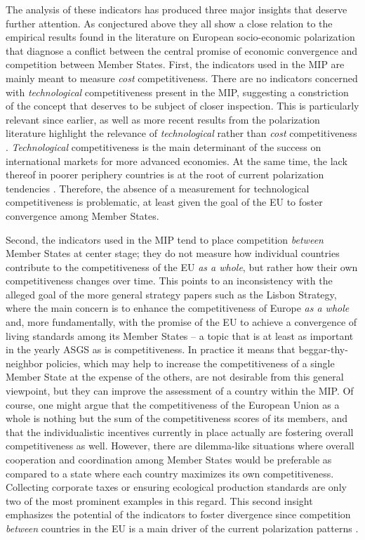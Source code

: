 \documentclass[
]{article}
\begin{document}
The analysis of these indicators has produced three major insights
that deserve further attention. As conjectured above they all show a close relation
to the empirical results found in the literature on European
socio-economic polarization
that diagnose a conflict between the central promise of economic convergence
and competition between Member States.
First, the indicators used in the MIP are mainly meant to
measure \emph{cost} competitiveness. There are no indicators concerned with \emph{technological}
competitiveness present in the MIP, suggesting a constriction of
the concept that deserves to be subject of closer inspection.
This is particularly relevant since earlier, as well as more recent results from
the polarization literature highlight the relevance of \emph{technological}
rather than \emph{cost} competitiveness
\citep[e.g.][]{Carlin.2001, Storm.2015jsi, Dosi.2015, Kapeller:2019cds}.
\emph{Technological} competitiveness is the main determinant of
the success on international markets for more advanced economies. At the same time,
the lack thereof in poorer periphery countries is at the root of current polarization
tendencies \citep[e.g.][]{Graebner.2020u}. Therefore, the absence of a measurement for
technological competitiveness is problematic, at least given the goal of the EU to
foster convergence among Member States.

Second, the indicators used in the MIP tend to place competition \emph{between}
Member States at center stage;
they do not measure how individual countries contribute to the competitiveness
of the EU \emph{as a whole}, but rather how their own competitiveness changes over
time. This points to an inconsistency with the alleged goal of the more
general strategy papers such as the Lisbon Strategy, where the main concern is to
enhance the competitiveness of Europe \emph{as a whole} and, more fundamentally, with
the promise of the EU to achieve a convergence of living standards among
its Member States -- a topic that is at least as important in the yearly ASGS
as is competitiveness.
In practice it means that beggar-thy-neighbor policies, which may help to increase the
competitiveness of a single Member State at the expense of the others, are not
desirable from this general viewpoint, but they can improve the assessment of
a country within the MIP.
Of course, one might argue that the competitiveness of the European Union as a
whole is nothing but the sum of the competitiveness scores of its members,
and that the individualistic incentives currently in place actually are
fostering overall competitiveness as well.
However, there are dilemma-like situations where overall cooperation
and coordination among Member States would be preferable as compared to a state
where each country maximizes its own competitiveness.
Collecting corporate taxes or ensuring ecological production standards are only
two of the most prominent examples in this regard.
This second insight emphasizes the potential of the indicators to foster divergence
since competition \emph{between} countries in the EU is a
main driver of the current polarization patterns \citep[e.g.][]{Kapeller:2019cds}.
\end{document}
